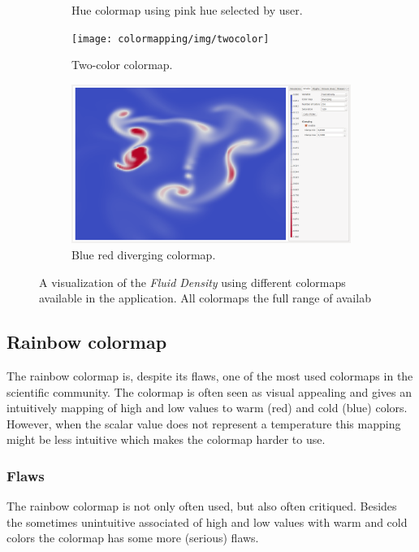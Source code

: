 \begin{figure}
\begin{subfigure}{0.44\textwidth}
		\caption{Hue colormap using pink hue selected by user.}
		\label{fig:colormapping:intro:differntColorMaps:hue}
	\end{subfigure}
	\begin{subfigure}{0.44\textwidth}
		\centering
		\texttt{[image: colormapping/img/twocolor]}
		\caption{Two-color colormap.}
		\label{fig:colormapping:intro:differntColorMaps:twocolor}
	\end{subfigure}	\begin{subfigure}{0.44\textwidth}
		\centering
		\includegraphics[width=\textwidth, trim={35px 30px 430px 30px}, clip]{colormapping/img/diverging}
		\caption{Blue red diverging colormap.}
		\label{fig:colormapping:intro:differntColorMaps:diverging}
	\end{subfigure}				

	\caption{A visualization of the \emph{Fluid Density} using different colormaps available in the application. All colormaps the full range of availab}
	\label{fig:colormapping:colormaps}
\end{figure}


\subsection{Rainbow colormap} %
\label{ssub:rainbow_colormap}
The rainbow colormap is, despite its flaws, one of the most used colormaps in the scientific community. The colormap is often seen as visual appealing and gives an intuitively mapping of high and low values to warm (red) and cold (blue) colors. However, when the scalar value does not represent a temperature this mapping might be less intuitive which makes the colormap harder to use.

\subsubsection{Flaws} %
\label{ssub:flaws}
The rainbow colormap is not only often used, but also often critiqued\cite{borland2007rainbow}\cite{divergingMoreland2009}. Besides the sometimes unintuitive associated of high and low values with warm and cold colors the colormap has some more (serious) flaws. 


